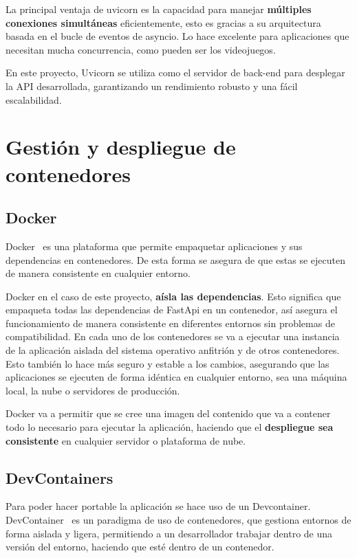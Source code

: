 La principal ventaja de uvicorn es la capacidad para manejar \textbf{múltiples conexiones simultáneas} eficientemente, esto es gracias a su arquitectura basada en el bucle de eventos de asyncio. Lo hace excelente para aplicaciones que necesitan mucha concurrencia, como pueden ser los videojuegos. 

En este proyecto, Uvicorn se utiliza como el servidor de back-end para desplegar la API desarrollada, garantizando un rendimiento robusto y una fácil escalabilidad.

\section{Gestión y despliegue de contenedores}

\subsection{Docker}
Docker~\cite{docker} es una plataforma que permite empaquetar aplicaciones y sus dependencias en contenedores. De esta forma se asegura de que estas se ejecuten de manera consistente en cualquier entorno.

Docker en el caso de este proyecto, \textbf{aísla las dependencias}. Esto significa que empaqueta todas las dependencias de FastApi en un contenedor, así asegura el funcionamiento de manera consistente en diferentes entornos sin problemas de compatibilidad. En cada uno de los contenedores se va a ejecutar una instancia de la aplicación aislada del sistema operativo anfitrión y de otros contenedores. Esto también lo hace más seguro y estable a los cambios, asegurando que las aplicaciones se ejecuten de forma idéntica en cualquier entorno, sea una máquina local, la nube o servidores de producción.

Docker va a permitir que se cree una imagen del contenido que va a contener todo lo necesario para ejecutar la aplicación, haciendo que el \textbf{despliegue sea consistente} en cualquier servidor o plataforma de nube.

\subsection{DevContainers}
Para poder hacer portable la aplicación se hace uso de un Devcontainer. DevContainer~\cite{devcontainers} es un paradigma de uso de contenedores, que gestiona entornos de forma aislada y ligera, permitiendo a un desarrollador trabajar dentro de una versión del entorno, haciendo que esté dentro de un contenedor. 

